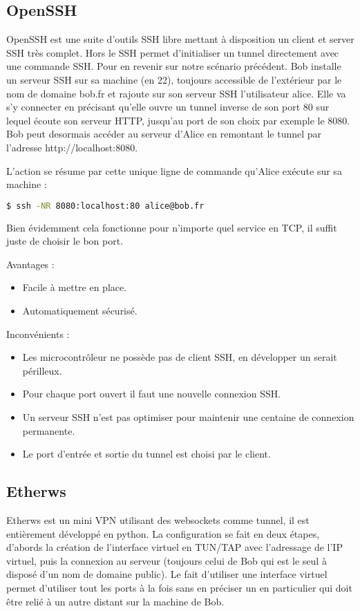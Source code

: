 \subsection{OpenSSH}

OpenSSH est une suite d'outils SSH libre mettant à disposition un client et server SSH très complet. Hors le SSH permet d'initialiser un tunnel directement avec une commande SSH. Pour en revenir sur notre scénario précédent. Bob installe un serveur SSH sur sa machine (en 22), toujours accessible de l'extérieur par le nom de domaine bob.fr et rajoute sur son serveur SSH l'utilisateur alice. Elle va s'y connecter en précisant qu'elle ouvre un tunnel inverse de son port 80 sur lequel écoute son serveur HTTP, jusqu'au port de son choix par exemple le 8080. Bob peut desormais accéder au serveur d'Alice en remontant le tunnel par l'adresse http://localhost:8080.

\noindent L'action se résume par cette unique ligne de commande qu'Alice exécute sur sa machine :
\begin{lstlisting}[language=bash]
  $ ssh -NR 8080:localhost:80 alice@bob.fr
\end{lstlisting}

Bien évidemment cela fonctionne pour n'importe quel service en TCP, il suffit juste de choisir le bon port.

Avantages :
\begin{itemize}
    \item Facile à mettre en place.
    \item Automatiquement sécurisé.
\end{itemize}

Inconvénients :
\begin{itemize}
    \item Les microcontrôleur ne possède pas de client SSH, en développer un serait périlleux.
    \item Pour chaque port ouvert il faut une nouvelle connexion SSH.
    \item Un serveur SSH n'est pas optimiser pour maintenir une centaine de connexion permanente.
    \item Le port d'entrée et sortie du tunnel est choisi par le client.
\end{itemize}

\subsection{Etherws}

Etherws est un mini VPN utilisant des websockets comme tunnel, il est entièrement développé en python. La configuration se fait en deux étapes, d'abords la création de l'interface virtuel en TUN/TAP avec l'adressage de l'IP virtuel, puis la connexion au serveur (toujours celui de Bob qui est le seul à disposé d'un nom de domaine public). Le fait d'utiliser une interface virtuel permet d'utiliser tout les ports à la fois sans en préciser un en particulier qui doit être relié à un autre distant sur la machine de Bob.

